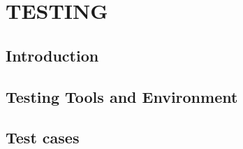 \chapter{TESTING}
\section{Introduction}     
\section{Testing Tools and Environment}	    
\section{Test cases}
